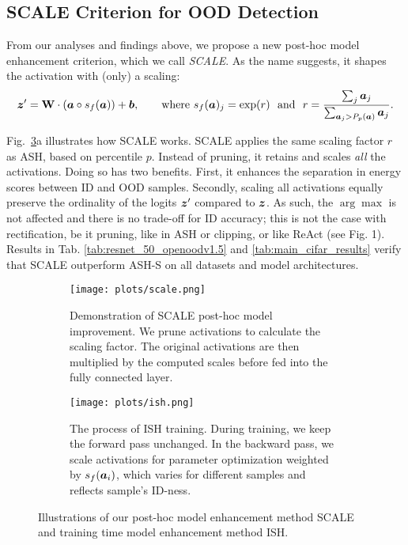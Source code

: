 \documentclass{article} %
\theoremstyle{plain}
\newcommand{\logit}{\vz}  %
\newcommand{\pF}{\va}     %
\begin{document}
\subsection{SCALE Criterion for OOD Detection}\label{sec:scale}

From our analyses and findings above, we propose a new post-hoc model enhancement criterion, which we call \textit{SCALE}. As the name suggests, it shapes the activation with (only) a scaling:    
\begin{equation}
    \logit' = \mathbf{W} \cdot \left(\pF \circ s_f(\pF)\right) + \vb, \qquad \text{where } s_f (\pF)_j = \exp(r)\ \text{ and }\ r = \frac{\sum_{j}{\va_j}}{\sum_{\va_j>P_{p}(\pF)}{\va_j}}.
\end{equation}

Fig.~\ref{fig:scale_ish}a illustrates how SCALE works. SCALE applies the same scaling factor $r$ as ASH, based on percentile $p$. Instead of pruning, it retains and scales \emph{all} the activations.  Doing so has two benefits. First, it enhances the separation in energy scores between ID and OOD samples. Secondly, scaling all activations equally preserve the ordinality of the logits $\logit'$ compared to $\logit$.  As such, the $\arg\max$ is not affected and there is no trade-off for ID accuracy; this is not the case with rectification, be it pruning, like in ASH or clipping, or like ReAct (see Fig. 1). Results in Tab. \ref{tab:resnet_50_openoodv1.5} and \ref{tab:main_cifar_results} verify that SCALE outperform ASH-S on all datasets and model architectures. 


\begin{figure}[tp]%
    \centering
    \begin{subfigure}[t]{0.50\linewidth}
        \centering
        \texttt{[image: plots/scale.png]}
        \caption{Demonstration of SCALE post-hoc model improvement. We prune activations to calculate the scaling factor. The original activations are then multiplied by the computed scales before fed into the fully connected layer. }\label{fig:scale}
    \end{subfigure}\hfil%
    \begin{subfigure}[t]{0.45\linewidth}
        \centering
        \texttt{[image: plots/ish.png]}
        \caption[b]{The process of ISH training. During training, we keep the forward pass unchanged. In the backward pass, we scale activations for parameter optimization weighted by $s_f(\pF_i)$, which varies for different samples and reflects sample's ID-ness.}\label{fig:ish}
     \end{subfigure}
     \caption{Illustrations of our post-hoc model enhancement method SCALE and training time model enhancement method  ISH.}\label{fig:scale_ish}
\end{figure}
\end{document}
